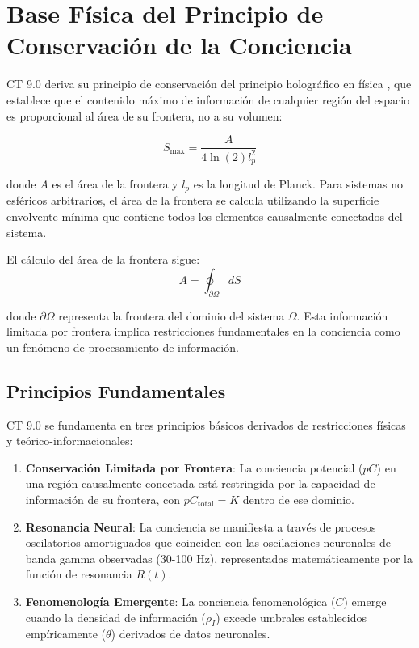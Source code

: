 \documentclass[12pt]{article}
\begin{document}
\section{Base Física del Principio de Conservación de la Conciencia}

CT 9.0 deriva su principio de conservación del principio holográfico en física \cite{susskind1995,bousso2002}, que establece que el contenido máximo de información de cualquier región del espacio es proporcional al área de su frontera, no a su volumen:

\begin{equation}
S_{\text{max}} = \frac{A}{4\ln(2)l_p^2}
\end{equation}

donde $A$ es el área de la frontera y $l_p$ es la longitud de Planck. Para sistemas no esféricos arbitrarios, el área de la frontera se calcula utilizando la superficie envolvente mínima que contiene todos los elementos causalmente conectados del sistema.

El cálculo del área de la frontera sigue:
\begin{equation}
A = \oint_{\partial \Omega} dS
\end{equation}

donde $\partial \Omega$ representa la frontera del dominio del sistema $\Omega$. Esta información limitada por frontera implica restricciones fundamentales en la conciencia como un fenómeno de procesamiento de información.

\subsection{Principios Fundamentales}
CT 9.0 se fundamenta en tres principios básicos derivados de restricciones físicas y teórico-informacionales:

\begin{enumerate}
    \item \textbf{Conservación Limitada por Frontera}: La conciencia potencial ($pC$) en una región causalmente conectada está restringida por la capacidad de información de su frontera, con $pC_{\text{total}} = K$ dentro de ese dominio.
    
    \item \textbf{Resonancia Neural}: La conciencia se manifiesta a través de procesos oscilatorios amortiguados que coinciden con las oscilaciones neuronales de banda gamma observadas (30-100 Hz), representadas matemáticamente por la función de resonancia $R(t)$.
    
    \item \textbf{Fenomenología Emergente}: La conciencia fenomenológica ($C$) emerge cuando la densidad de información ($\rho_I$) excede umbrales establecidos empíricamente ($\theta$) derivados de datos neuronales.
\end{enumerate}
\end{document}
